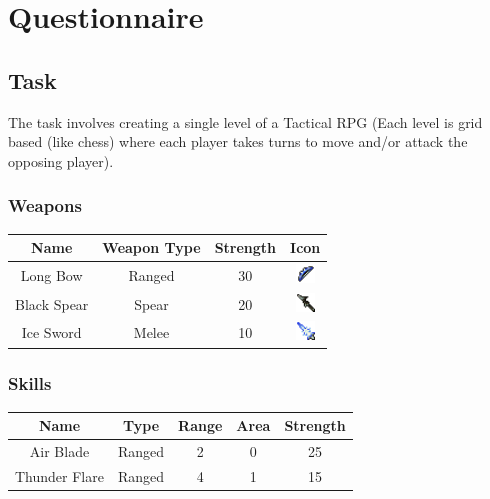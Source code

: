 \section{Questionnaire}
\label{sec:questionnaire}
\subsection*{Task}

The task involves creating a single level of a Tactical RPG (Each level is grid based (like chess) where each player takes turns to move and/or attack the opposing player).   

\subsubsection*{Weapons}
\begin{center}
\begin{tabular}{c|c|c|c|}
	Name        & Weapon Type & Strength & Icon \\\hline
	Long Bow    & Ranged      & 30       & \includegraphics[height=0.5cm]{figures/bow.png}   \\ 
	Black Spear & Spear       & 20       & \includegraphics[height=0.5cm]{figures/spear.png} \\ 
	Ice Sword   & Melee       & 10       & \includegraphics[height=0.5cm]{figures/sword.png} \\ 
\end{tabular}
\end{center}

\subsubsection*{Skills}
\begin{center}
	\begin{tabular}{c|c|c|c|c}
		
		Name          & Type   & Range & Area & Strength \\\hline
		Air Blade     & Ranged & 2     & 0    & 25       \\ 
		Thunder Flare & Ranged & 4     & 1    & 15       \\ 
	\end{tabular}
\end{center}


